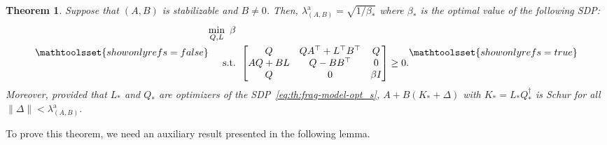 \documentclass[9pt,shortpaper,twoside,web]{ieeecolor}
\newtheorem{theorem}{Theorem}
\newtheorem{remark}[theorem]{Remark}
\begin{document}

\begin{theorem}
\label{th:frag-model-opt}
Suppose that $(A,B)$ is stabilizable and \mbox{$B\neq 0$}. Then, $\lambda_{(A,B)}^{\text{a}}=\sqrt{1/\beta_*}$ where $\beta_*$ is the optimal value of the following SDP: 
\begin{subequations}
\mathtoolsset{showonlyrefs=false}
\label{eq:th:frag-model-opt_s}
\begin{align}
\label{eq:th:frag-model-opt_s(a)}
\min_{Q,L}\ \beta & \\
\label{eq:th:frag-model-opt_s(b)}
\text{s.t.}&\hspace{0.15 cm}
\begin{bmatrix}
Q & QA^\top+L^\top B^\top  & Q \\
AQ+BL & Q-BB^\top  & 0 \\
Q & 0  & \beta I
\end{bmatrix}\geq 0.
\end{align}
\mathtoolsset{showonlyrefs=true}
\end{subequations}
Moreover, provided that $L_*$ and $Q_*$ are optimizers of the SDP~\eqref{eq:th:frag-model-opt_s}, $A+B(K_*+\Delta)$ with $K_*=L_*Q_*^{\dagger}$ is Schur for all $\|\Delta\|<\lambda_{(A,B)}^{\text{a}}$.   
\end{theorem}

To prove this theorem, we need an auxiliary result presented in the following lemma.
\end{document}

